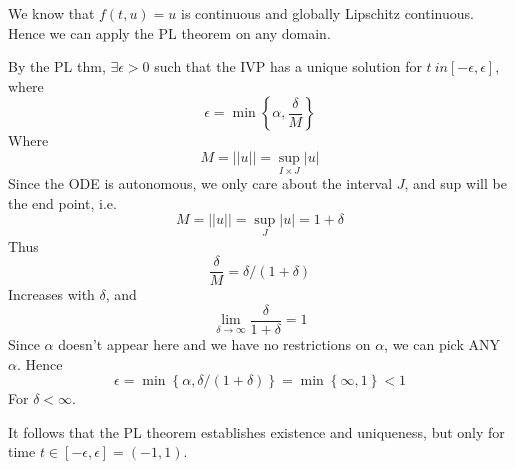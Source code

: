 \documentclass{/home/janmebows/Documents/LatexTemplates/myassignment}
\begin{document}
We know that $f(t,u) = u$ is continuous and globally Lipschitz continuous. Hence we can apply the PL theorem on any domain.

By the PL thm, $\exists \epsilon > 0$ such that the IVP has a unique solution for $t \ in [-\epsilon,\epsilon]$, where
\[\epsilon = \min\left\{\alpha,\frac \delta M\right\}\] 
Where 
\[M = ||u|| = \sup_{I\times J} |u|\]
Since the ODE is autonomous, we only care about the interval $J$, and sup will be the end point, i.e.
\[M = ||u|| = \sup_{J} |u| = 1+\delta\]
Thus 
\[\frac \delta M = \delta/(1+\delta)\]
Increases with $\delta$, and
\[\lim_{\delta\to\infty} \frac{\delta}{1+\delta} = 1\]
Since $\alpha$ doesn't appear here and we have no restrictions on $\alpha$, we can pick ANY $\alpha$. Hence
\[\epsilon = \min\left\{\alpha,\delta/(1+\delta)\right\} = \min\left\{\infty, 1\right\} < 1\]
For $\delta < \infty$.

It follows that the PL theorem establishes existence and uniqueness, but only for time $t \in [-\epsilon,\epsilon] = (-1,1)$.








\end{document}
